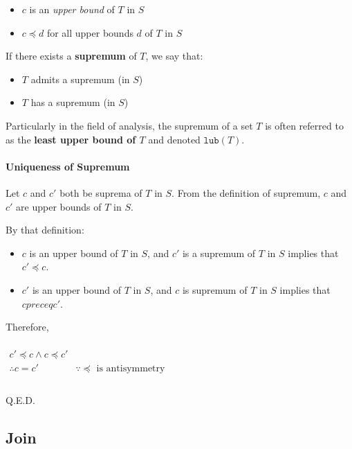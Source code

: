 \begin{itemize}
\item $c$ is an \textit{upper bound} of $T$ in $S$
\item $c \preceq d$ for all upper bounds $d$ of $T$ in $S$
\end{itemize}

If there exists a \textbf{supremum} of $T$, we say that:

\begin{itemize}
\item $T$ admits a supremum (in $S$)
\item $T$ has a supremum (in $S$)
\end{itemize}


Particularly in the field of analysis, the supremum of a set $T$ is
often referred to as the \textbf{least upper bound of $T$} and denoted
$\mathtt{lub}(T)$.


\paragraph{Uniqueness of Supremum}

Let $c$ and $c'$ both be suprema of $T$ in $S$. From the definition of
supremum, $c$ and $c'$ are upper bounds of $T$ in $S$.

By that definition:

\begin{itemize}
\item $c$ is an upper bound of $T$ in $S$, and $c'$ is a supremum of
  $T$ in $S$ implies that $c' \preceq c$.
\item $c'$ is an upper bound of $T$ in $S$, and $c$ is supremum of $T$
  in $S$ implies that $c preceq c'$.
\end{itemize}

Therefore,

\begin{math}
  \begin{array}{ll}
    \\
    c' \preceq c \land c \preceq c'\\
    \therefore c = c' & \because \preceq \text{ is antisymmetry}\\
    \\
  \end{array}
\end{math}

Q.E.D.


\subsection{Join}
\label{sec:join}

